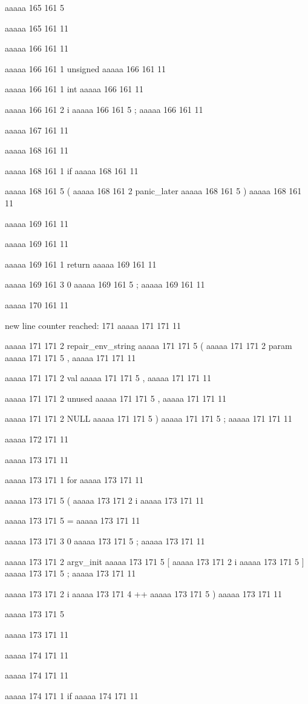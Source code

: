 aaaaa 165 161
5
{
aaaaa 165 161
11


aaaaa 166 161
11
	
aaaaa 166 161
1
unsigned
aaaaa 166 161
11
 
aaaaa 166 161
1
int
aaaaa 166 161
11
 
aaaaa 166 161
2
i
aaaaa 166 161
5
;
aaaaa 166 161
11


aaaaa 167 161
11


aaaaa 168 161
11
	
aaaaa 168 161
1
if
aaaaa 168 161
11
 
aaaaa 168 161
5
(
aaaaa 168 161
2
panic_later
aaaaa 168 161
5
)
aaaaa 168 161
11


aaaaa 169 161
11
	
aaaaa 169 161
11
	
aaaaa 169 161
1
return
aaaaa 169 161
11
 
aaaaa 169 161
3
0
aaaaa 169 161
5
;
aaaaa 169 161
11


aaaaa 170 161
11


new line counter reached: 171
aaaaa 171 171
11
	
aaaaa 171 171
2
repair_env_string
aaaaa 171 171
5
(
aaaaa 171 171
2
param
aaaaa 171 171
5
,
aaaaa 171 171
11
 
aaaaa 171 171
2
val
aaaaa 171 171
5
,
aaaaa 171 171
11
 
aaaaa 171 171
2
unused
aaaaa 171 171
5
,
aaaaa 171 171
11
 
aaaaa 171 171
2
NULL
aaaaa 171 171
5
)
aaaaa 171 171
5
;
aaaaa 171 171
11


aaaaa 172 171
11


aaaaa 173 171
11
	
aaaaa 173 171
1
for
aaaaa 173 171
11
 
aaaaa 173 171
5
(
aaaaa 173 171
2
i
aaaaa 173 171
11
 
aaaaa 173 171
5
=
aaaaa 173 171
11
 
aaaaa 173 171
3
0
aaaaa 173 171
5
;
aaaaa 173 171
11
 
aaaaa 173 171
2
argv_init
aaaaa 173 171
5
[
aaaaa 173 171
2
i
aaaaa 173 171
5
]
aaaaa 173 171
5
;
aaaaa 173 171
11
 
aaaaa 173 171
2
i
aaaaa 173 171
4
++
aaaaa 173 171
5
)
aaaaa 173 171
11
 
aaaaa 173 171
5
{
aaaaa 173 171
11


aaaaa 174 171
11
	
aaaaa 174 171
11
	
aaaaa 174 171
1
if
aaaaa 174 171
11
 
}}
